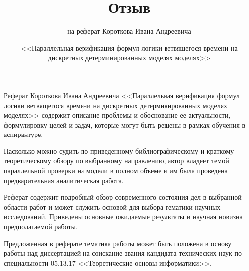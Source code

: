 \documentclass[a4paper,12pt,notitlepage]{article}
\title{Отзыв}
\date{\normalsize{<<Параллельная верификация формул логики ветвящегося времени на
    дискретных детерминированных моделях моделях>>}}
\author{\small{на реферат Короткова Ивана Андреевича}}
\begin{document}
\maketitle

\vspace{1cm}

\thispagestyle{empty}

Реферат Короткова Ивана Андреевича <<Параллельная верификация формул логики ветвящегося
времени на дискретных детерминированных моделях моделях>> содержит описание проблемы и
обоснование ее актуальности, формулировку целей и задач, которые могут быть решены в
рамках обучения в аспирантуре. 

Насколько можно судить по приведенному библиографическому и краткому теоретическому обзору
по выбранному направлению, автор владеет темой параллельной проверки на модели в полном
объеме и им была проведена предварительная аналитическая работа.

Реферат содержит подробный обзор современного состояния дел в выбранной области работ и
может служить основой для выбора тематики научных исследований. 
Приведены основные ожидаемые результаты и научная новизна
предполагаемой работы.

Предложенная в реферате тематика работы может быть положена в основу работы над
диссертацией на соискание звания кандидата технических наук по специальности 05.13.17
<<Теоретические основы информатики>>.

\end{document}
